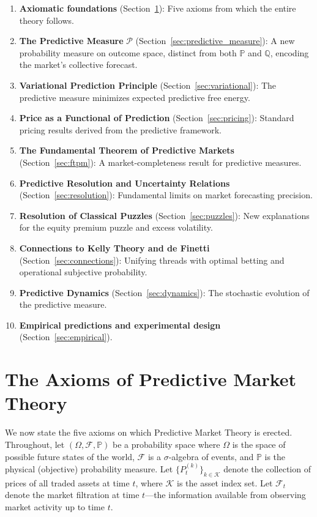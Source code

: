 \documentclass[12pt,a4paper]{article}
\theoremstyle{definition}
\newcommand{\Prob}{\mathbb{P}}
\newcommand{\Q}{\mathbb{Q}}
\newcommand{\F}{\mathcal{F}}
\newcommand{\PP}{\mathcal{P}}
\begin{document}
\begin{enumerate}
    \item \textbf{Axiomatic foundations} (Section~\ref{sec:axioms}): Five axioms from which the entire theory follows.
    \item \textbf{The Predictive Measure} $\PP$ (Section~\ref{sec:predictive_measure}): A new probability measure on outcome space, distinct from both $\Prob$ and $\Q$, encoding the market's collective forecast.
    \item \textbf{Variational Prediction Principle} (Section~\ref{sec:variational}): The predictive measure minimizes expected predictive free energy.
    \item \textbf{Price as a Functional of Prediction} (Section~\ref{sec:pricing}): Standard pricing results derived from the predictive framework.
    \item \textbf{The Fundamental Theorem of Predictive Markets} (Section~\ref{sec:ftpm}): A market-completeness result for predictive measures.
    \item \textbf{Predictive Resolution and Uncertainty Relations} (Section~\ref{sec:resolution}): Fundamental limits on market forecasting precision.
    \item \textbf{Resolution of Classical Puzzles} (Section~\ref{sec:puzzles}): New explanations for the equity premium puzzle and excess volatility.
    \item \textbf{Connections to Kelly Theory and de Finetti} (Section~\ref{sec:connections}): Unifying threads with optimal betting and operational subjective probability.
    \item \textbf{Predictive Dynamics} (Section~\ref{sec:dynamics}): The stochastic evolution of the predictive measure.
    \item \textbf{Empirical predictions and experimental design} (Section~\ref{sec:empirical}).
\end{enumerate}



\section{The Axioms of Predictive Market Theory}\label{sec:axioms}

We now state the five axioms on which Predictive Market Theory is erected. Throughout, let $(\Omega, \F, \Prob)$ be a probability space where $\Omega$ is the space of possible future states of the world, $\F$ is a $\sigma$-algebra of events, and $\Prob$ is the physical (objective) probability measure. Let $\{P_t^{(k)}\}_{k \in \mathcal{K}}$ denote the collection of prices of all traded assets at time $t$, where $\mathcal{K}$ is the asset index set. Let $\F_t$ denote the market filtration at time $t$---the information available from observing market activity up to time $t$.
\end{document}
